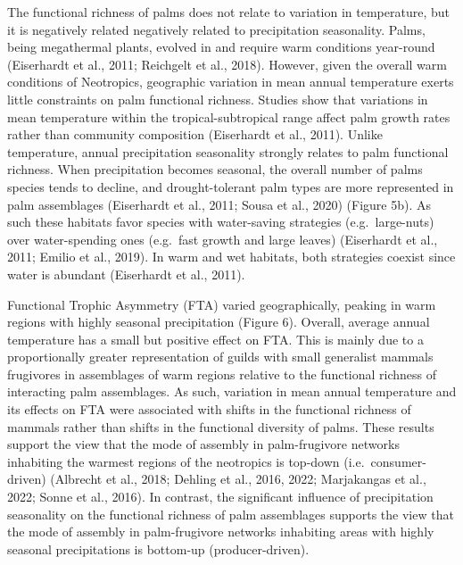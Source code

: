 \documentclass[
]{agujournal2019}
\begin{document}
The functional richness of palms does not relate to variation in
temperature, but it is negatively related negatively related to
precipitation seasonality. Palms, being megathermal plants, evolved in
and require warm conditions year-round (Eiserhardt et al., 2011;
Reichgelt et al., 2018). However, given the overall warm conditions of
Neotropics, geographic variation in mean annual temperature exerts
little constraints on palm functional richness. Studies show that
variations in mean temperature within the tropical-subtropical range
affect palm growth rates rather than community composition (Eiserhardt
et al., 2011). Unlike temperature, annual precipitation seasonality
strongly relates to palm functional richness. When precipitation becomes
seasonal, the overall number of palms species tends to decline, and
drought-tolerant palm types are more represented in palm assemblages
(Eiserhardt et al., 2011; Sousa et al., 2020) (Figure 5b). As such these
habitats favor species with water-saving strategies (e.g.~large-nuts)
over water-spending ones (e.g.~fast growth and large leaves) (Eiserhardt
et al., 2011; Emilio et al., 2019). In warm and wet habitats, both
strategies coexist since water is abundant (Eiserhardt et al., 2011).

Functional Trophic Asymmetry (FTA) varied geographically, peaking in
warm regions with highly seasonal precipitation (Figure 6). Overall,
average annual temperature has a small but positive effect on FTA. This
is mainly due to a proportionally greater representation of guilds with
small generalist mammals frugivores in assemblages of warm regions
relative to the functional richness of interacting palm assemblages. As
such, variation in mean annual temperature and its effects on FTA were
associated with shifts in the functional richness of mammals rather than
shifts in the functional diversity of palms. These results support the
view that the mode of assembly in palm-frugivore networks inhabiting the
warmest regions of the neotropics is top-down (i.e.~consumer-driven)
(Albrecht et al., 2018; Dehling et al., 2016, 2022; Marjakangas et al.,
2022; Sonne et al., 2016). In contrast, the significant influence of
precipitation seasonality on the functional richness of palm assemblages
supports the view that the mode of assembly in palm-frugivore networks
inhabiting areas with highly seasonal precipitations is bottom-up
(producer-driven).
\end{document}
